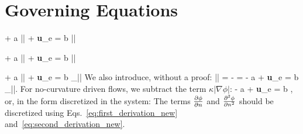 \documentclass[fleqn]{article}    %
\begin{document}
\section{Governing Equations}

\be
   + a |\nabla \phi| + {\bf u}_e \cdot \nabla \phi 
= b \kappa |\nabla \phi|
\ee

\be
   + a |\nabla \phi| + {\bf u}_e \cdot \nabla \phi 
= b 
    |\nabla \phi|
\ee

\be
   + a |\nabla \phi| + {\bf u}_e \cdot \nabla \phi 
= b \underbrace{ \left[ 
     \nabla^2 \phi - \frac{(\nabla \phi \cdot \nabla) |\nabla \phi|}{|\nabla \phi|} 
    \right] }_{\kappa |\nabla \phi|}
\ee
%
We also introduce, without a proof:
%
\be
  |\nabla \phi| = -
\ee
%
\be
  \frac{(\nabla \phi \cdot \nabla) |\nabla \phi|}{|\nabla \phi|} = 
\ee
%
\be
   - a  + {\bf u}_e \cdot \nabla \phi 
= b _{\kappa |\nabla \phi|}.
\ee
%
For no-curvature driven flows, we subtract the term $\kappa |\nabla \phi|$:
%
\be
   - a  + {\bf u}_e \cdot \nabla \phi 
= b ,
\ee
%
or, in the form discretized in the system:
%
%
The terms $\frac{\partial \phi}{\partial n}$ and $\frac{\partial^2 \phi}{\partial n^2}$ should be
discretized using Eqs.~\ref{eq:first_derivation_new} 
and~\ref{eq:second_derivation_new}.
\end{document}
